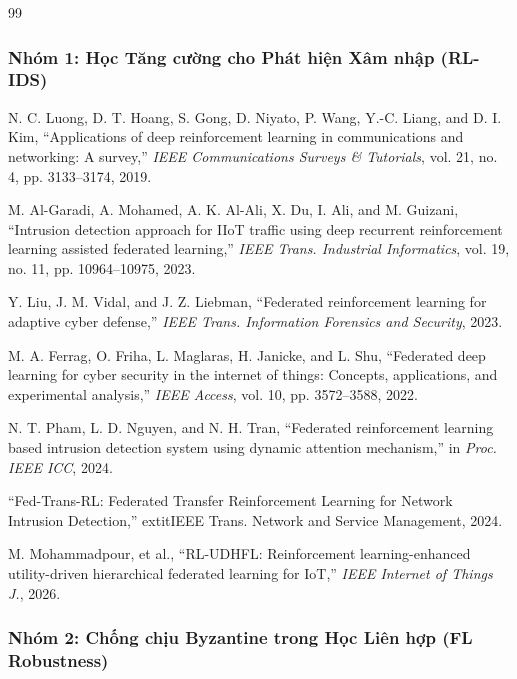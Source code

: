 \documentclass[12pt,a4paper]{article}
\begin{document}
\begin{thebibliography}{99}

\subsubsection*{Nhóm 1: Học Tăng cường cho Phát hiện Xâm nhập (RL-IDS)}

  N. C. Luong, D. T. Hoang, S. Gong, D. Niyato, P. Wang, Y.-C. Liang, and D. I. Kim, ``Applications of deep reinforcement learning in communications and networking: A survey,'' \textit{IEEE Communications Surveys \& Tutorials}, vol. 21, no. 4, pp. 3133--3174, 2019.

  M. Al-Garadi, A. Mohamed, A. K. Al-Ali, X. Du, I. Ali, and M. Guizani, ``Intrusion detection approach for IIoT traffic using deep recurrent reinforcement learning assisted federated learning,'' \textit{IEEE Trans. Industrial Informatics}, vol. 19, no. 11, pp. 10964--10975, 2023.

  Y. Liu, J. M. Vidal, and J. Z. Liebman, ``Federated reinforcement learning for adaptive cyber defense,'' \textit{IEEE Trans. Information Forensics and Security}, 2023.

  M. A. Ferrag, O. Friha, L. Maglaras, H. Janicke, and L. Shu, ``Federated deep learning for cyber security in the internet of things: Concepts, applications, and experimental analysis,'' \textit{IEEE Access}, vol. 10, pp. 3572--3588, 2022.

  N. T. Pham, L. D. Nguyen, and N. H. Tran, ``Federated reinforcement learning based intrusion detection system using dynamic attention mechanism,'' in \textit{Proc. IEEE ICC}, 2024.


  ``Fed-Trans-RL: Federated Transfer Reinforcement Learning for Network Intrusion Detection,'' 	extit{IEEE Trans. Network and Service Management}, 2024.

  M. Mohammadpour, et al., ``RL-UDHFL: Reinforcement learning-enhanced utility-driven hierarchical federated learning for IoT,'' \textit{IEEE Internet of Things J.}, 2026.

\subsubsection*{Nhóm 2: Chống chịu Byzantine trong Học Liên hợp (FL Robustness)}


\end{thebibliography}
\end{document}
